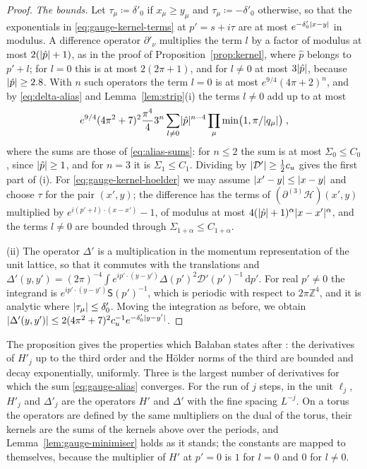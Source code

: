 \documentclass[11pt]{preprint}
\newcommand{\dd}{\mathrm{d}}
\DeclarePairedDelimiter{\abs}{\lvert}{\rvert}
\numberwithin{equation}{section}
\theoremstyle{definition}
\theoremstyle{remark}
\theoremstyle{plain}
\begin{document}
\begin{proof}
\emph{The bounds.} Let $\tau_\mu \coloneqq \delta'_0$ if $x_\mu \geq y_\mu$ and $\tau_\mu \coloneqq -\delta'_0$ otherwise, so that the exponentials in \eqref{eq:gauge-kernel-terms} at $p' = s + i\tau$ are at most $e^{-\delta'_0\abs{x - y}}$ in modulus. A difference operator $\partial'_\nu$ multiplies the term $l$ by a factor of modulus at most $2(\abs{\hat p} + 1)$, as in the proof of Proposition~\ref{prop:kernel}, where $\hat p$ belongs to $p' + l$; for $l = 0$ this is at most $2(2\pi + 1)$, and for $l \neq 0$ at most $3\abs{\hat p}$, because $\abs{\hat p} \geq 2.8$. With $n$ such operators the term $l = 0$ is at most $e^{9/4}(4\pi + 2)^n$, and by \eqref{eq:delta-alias} and Lemma~\ref{lem:strip}(i) the terms $l \neq 0$ add up to at most
\begin{equation}\label{eq:gauge-alias}
    e^{9/4}(4\pi^2 + 7)^2\frac{\pi^4}{4}3^n\sum_{l \neq 0}\abs{\hat p}^{n-4}\prod_\mu\min\bigl(1, \pi/\abs{q_\mu}\bigr)\;,
\end{equation}
where the sums are those of \eqref{eq:alias-sums}: for $n \leq 2$ the sum is at most $\Sigma_0 \leq C_0$, since $\abs{\hat p} \geq 1$, and for $n = 3$ it is $\Sigma_1 \leq C_1$. Dividing by $\abs{\mathcal D'} \geq \frac12c_u$ gives the first part of (i). For \eqref{eq:gauge-kernel-hoelder} we may assume $\abs{x' - y} \leq \abs{x - y}$ and choose $\tau$ for the pair $(x', y)$; the difference has the terms of $(\partial^{(3)}\mathcal H)(x', y)$ multiplied by $e^{i(p' + l) \cdot (x - x')} - 1$, of modulus at most $4(\abs{\hat p} + 1)^\alpha\abs{x - x'}^\alpha$, and the terms $l \neq 0$ are bounded through $\Sigma_{1+\alpha} \leq C_{1+\alpha}$.

(ii) The operator $\Delta'$ is a multiplication in the momentum representation of the unit lattice, so that it commutes with the translations and $\Delta'(y, y') = (2\pi)^{-4}\int e^{ip' \cdot (y - y')}\Delta(p')^2\mathcal D'(p')^{-1}\,\dd p'$. For real $p' \neq 0$ the integrand is $e^{ip' \cdot (y - y')}\mathsf S(p')^{-1}$, which is periodic with respect to $2\pi\mathbb Z^4$, and it is analytic where $\abs{\tau_\mu} \leq \delta'_0$. Moving the integration as before, we obtain $\abs{\Delta'(y, y')} \leq 2(4\pi^2 + 7)^2c_u^{-1}e^{-\delta'_0\abs{y - y'}}$.
\end{proof}

The proposition gives the properties which Ba{\l}aban states after \cite[(2.132)]{BalabanPRT2}: the derivatives of $H'_j$ up to the third order and the H\"older norms of the third are bounded and decay exponentially, uniformly. Three is the largest number of derivatives for which the sum \eqref{eq:gauge-alias} converges. For the run of $j$ steps, in the unit $\ell_j$, $H'_j$ and $\Delta'_j$ are the operators $H'$ and $\Delta'$ with the fine spacing $L^{-j}$. On a torus the operators are defined by the same multipliers on the dual of the torus, their kernels are the sums of the kernels above over the periods, and Lemma~\ref{lem:gauge-minimiser} holds as it stands; the constants are mapped to themselves, because the multiplier of $H'$ at $p' = 0$ is $1$ for $l = 0$ and $0$ for $l \neq 0$.
\end{document}
